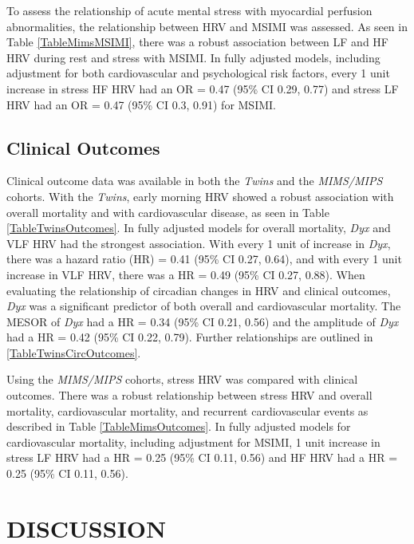 \documentclass[
  11pt,
  openany]{book}
\begin{document}
To assess the relationship of acute mental stress with myocardial perfusion abnormalities, the relationship between HRV and MSIMI was assessed. As seen in Table \ref{TableMimsMSIMI}, there was a robust association between LF and HF HRV during rest and stress with MSIMI. In fully adjusted models, including adjustment for both cardiovascular and psychological risk factors, every 1 unit increase in stress HF HRV had an OR = 0.47 (95\% CI 0.29, 0.77) and stress LF HRV had an OR = 0.47 (95\% CI 0.3, 0.91) for MSIMI.

\hypertarget{clinical-outcomes-1}{%
\chapter{Clinical Outcomes}\label{clinical-outcomes-1}}

Clinical outcome data was available in both the \emph{Twins} and the \emph{MIMS/MIPS} cohorts.
With the \emph{Twins}, early morning HRV showed a robust association with overall mortality and with cardiovascular disease, as seen in Table \ref{TableTwinsOutcomes}.
In fully adjusted models for overall mortality, \emph{Dyx} and VLF HRV had the strongest association.
With every 1 unit of increase in \emph{Dyx}, there was a hazard ratio (HR) = 0.41 (95\% CI 0.27, 0.64), and with every 1 unit increase in VLF HRV, there was a HR = 0.49 (95\% CI 0.27, 0.88).
When evaluating the relationship of circadian changes in HRV and clinical outcomes, \emph{Dyx} was a significant predictor of both overall and cardiovascular mortality.
The MESOR of \emph{Dyx} had a HR = 0.34 (95\% CI 0.21, 0.56) and the amplitude of \emph{Dyx} had a HR = 0.42 (95\% CI 0.22, 0.79).
Further relationships are outlined in \ref{TableTwinsCircOutcomes}.

Using the \emph{MIMS/MIPS} cohorts, stress HRV was compared with clinical outcomes.
There was a robust relationship between stress HRV and overall mortality, cardiovascular mortality, and recurrent cardiovascular events as described in Table \ref{TableMimsOutcomes}.
In fully adjusted models for cardiovascular mortality, including adjustment for MSIMI, 1 unit increase in stress LF HRV had a HR = 0.25 (95\% CI 0.11, 0.56) and HF HRV had a HR = 0.25 (95\% CI 0.11, 0.56).

\hypertarget{part-discussion}{%
\part*{DISCUSSION}\label{part-discussion}}
\end{document}
